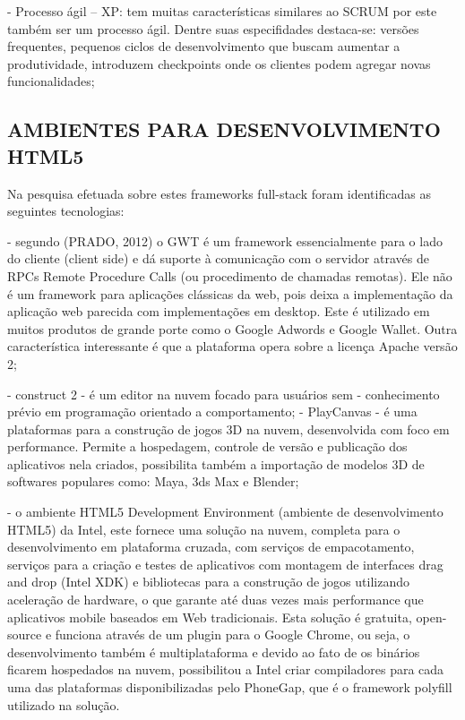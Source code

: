 \documentclass[11pt,a4paper]{article}
\begin{document}
- Processo ágil – XP: tem muitas características similares ao SCRUM
por este também ser um processo ágil. Dentre suas especifidades
destaca-se: versões frequentes, pequenos ciclos de desenvolvimento que
buscam aumentar a produtividade, introduzem checkpoints onde os clientes
podem agregar novas funcionalidades;

\subsection{ AMBIENTES PARA DESENVOLVIMENTO HTML5}

Na pesquisa efetuada sobre estes frameworks full-stack foram
identificadas as seguintes tecnologias:

    - segundo (PRADO, 2012) o GWT é um framework essencialmente para
o lado do cliente (client side) e dá suporte à comunicação com
o servidor através de RPCs Remote Procedure Calls (ou procedimento
de chamadas remotas). Ele não é um framework para aplicações
clássicas da web, pois deixa a implementação da aplicação web
parecida com implementações em desktop. Este é utilizado em muitos
produtos de grande porte como o Google Adwords e Google Wallet. Outra
característica interessante é que a plataforma opera sobre a licença
Apache versão 2;

    - construct 2 - é um editor na nuvem focado para usuários sem
    - conhecimento prévio em programação orientado a comportamento;
    - PlayCanvas - é uma plataformas para a construção de jogos 3D
na nuvem, desenvolvida com foco em performance. Permite a hospedagem,
controle de versão e publicação dos aplicativos nela criados,
possibilita também a importação de modelos 3D de softwares populares
como: Maya, 3ds Max e Blender;

    - o ambiente HTML5 Development Environment (ambiente de
desenvolvimento HTML5) da Intel, este fornece uma solução na nuvem,
completa para o desenvolvimento em plataforma cruzada, com serviços de
empacotamento, serviços para a criação e testes de aplicativos com
montagem de interfaces drag and drop (Intel XDK) e bibliotecas para a
construção de jogos utilizando aceleração de hardware, o que garante
até duas vezes mais performance que aplicativos mobile baseados em
Web tradicionais. Esta solução é gratuita, open-source e funciona
através de um plugin para o Google Chrome, ou seja, o desenvolvimento
também é multiplataforma e devido ao fato de os binários ficarem
hospedados na nuvem, possibilitou a Intel criar compiladores para cada
uma das plataformas disponibilizadas pelo PhoneGap, que é o framework
polyfill utilizado na solução.
\end{document}
